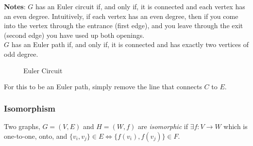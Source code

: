 \documentclass{article}
\begin{document}
            \noindent \textbf{Notes}: $G$ has an Euler circuit if, and only if, it is connected and each vertex has an even degree. Intuitively, if each vertex has an even degree, then if you come into the vertex through the entrance (first edge), and you leave through the exit (second edge) you have used up both openings. \\
    
            $G$ has an Euler path if, and only if, it is connected and has exactly two vertices of odd degree. 
    
            \begin{figure}[h]
                \centering
                \caption{Euler Circuit}
            \end{figure}
    
            \centerline{For this to be an Euler path, simply remove the line that connects $C$ to $E$.}

\vspace{3.5cm}

        \subsubsection{Isomorphism}
            \begin{definition}
                Two graphs, $G = (V,E)$ and $H = (W,f)$ are \textit{isomorphic} if $\exists f\colon V\rightarrow W$ which is one-to-one, onto, and $\{v_i, v_j\} \in E \iff \{f(v_i), f(v_j)\} \in F$.
            \end{definition}
\end{document}
